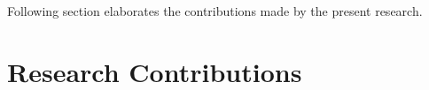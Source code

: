 
Following section elaborates the contributions made by the present research.%


\section{Research Contributions}

